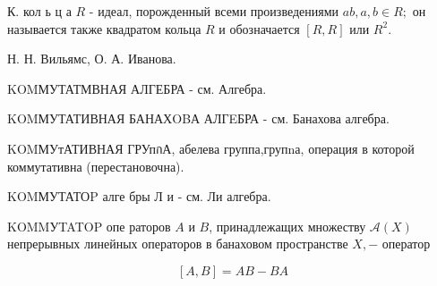 \documentclass[10pt]{article}
\begin{document}
К. кол ь ц а $R$ - идеал, порожденный всеми произведениями $a b, a, b \in R ;$ он называется также квадратом кольца $R$ и обозначается $[R, R]$ или $R^{2}$.



Н. Н. Вильямс, О. А. Иванова.



KOMМУТАТМВНАЯ АЛГЕБРА - см. Алгебра.



KOMМУТАТИВНАЯ БАНАХOBА АЛГEБРА - см. Банахова алгебра.



KOMМУтАТИВНАЯ ГРУпกА, абелева группа,групnа, операция в которой коммутативна (перестановочна).



KOMМУТАТОP алге бры Л и - см. Ли алгебра.



KOMMУTATOP опе раторов $A$ и $B$, принадлежащих множеству $\mathscr{A}(X)$ непрерывных линейных операторов в банаховом пространстве $X,-$ оператор



\[

[A, B]=A B-B A

\]
\end{document}
